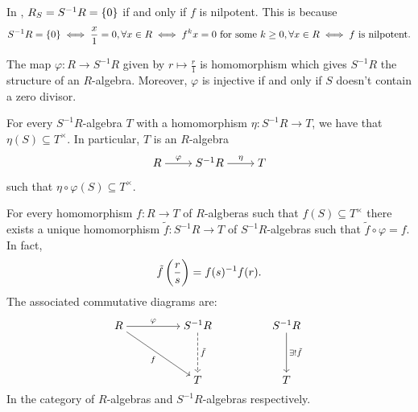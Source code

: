 \documentclass[11pt,a4paper]{article}
\begin{document}
\begin{remark}
  In ,
  $R_S = S^{-1}R = \left\{0\right\}$ if and only if $f$ is nilpotent.
  This is because
  \[
    S^{-1}R = \left\{0\right\} \iff
    \frac{x}{1} = 0, \forall x \in R \iff
    f^k x = 0 \text{ for some $k \geq 0$}, \forall x \in R \iff
    f \text{ is nilpotent.}
  \]
\end{remark}

\begin{remark}
  The map $\varphi \colon R \to S^{-1}R$ given by $r \mapsto \frac{r}{1}$
  is  homomorphism which gives $S^{-1}R$ the structure of an $R$-algebra.
  Moreover, $\varphi$ is injective if and only if  $S$ doesn't
  contain a zero divisor.
\end{remark}

\begin{remark}
  For every $S^{-1}R$-algebra $T$
  with a homomorphism $\eta \colon S^{-1}R \to T$,
  we have that $\eta(S) \subseteq T^{\times}$.
  In particular, $T$ is an $R$-algebra
  \[\begin{tikzcd}[ampersand replacement=\&,cramped]
    R \& {S^{-1}R} \& T
    \arrow["\varphi", from=1-1, to=1-2]
    \arrow["\eta", from=1-2, to=1-3]
  \end{tikzcd}\]
  such that $\eta \circ \varphi(S) \subseteq T^{\times}$.
\end{remark}

\begin{definition}
  For every homomorphism $f \colon R \to T$ of $R$-algberas
  such that $f(S) \subseteq T^{\times}$ there exists a unique
  homomorphism $\tilde f \colon S^{-1}R \to T$
  of $S^{-1}R$-algebras such that $\tilde f \circ \varphi = f$.
  In fact,
  \[
    \tilde f\del{\frac{r}{s}} = f(s)^{-1} f(r).
  \]
  The associated commutative diagrams are:
  \[\begin{tikzcd}[ampersand replacement=\&,cramped]
    R \&\& {S^{-1}R} \&\& {S^{-1}R} \\
    \\
    \&\& T \&\& T
    \arrow["\varphi", from=1-1, to=1-3]
    \arrow["f"', from=1-1, to=3-3]
    \arrow["{\tilde f}", dashed, from=1-3, to=3-3]
    \arrow["{\exists!\tilde f}", from=1-5, to=3-5]
  \end{tikzcd}\]
  In the category of $R$-algebras and $S^{-1}R$-algebras respectively.
\end{definition}

%
\end{document}
